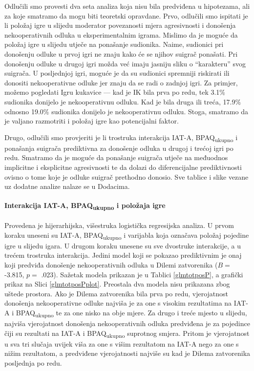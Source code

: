 \documentclass[a4paper, 12pt]{report}
\begin{document}
Odlučili smo provesti dva seta analiza koja nisu bila predviđena u hipotezama,
ali za koje smatramo da mogu biti teoretski opravdane. Prvo, odlučili smo
ispitati je li položaj igre u slijedu moderator povezanosti mjera agresivnosti i
donošenja nekooperativnih odluka u eksperimentalnim igrama. Mislimo da je moguće
da položaj igre u slijedu utječe na ponašanje sudionika. Naime, sudionici 
pri donošenju odluke u prvoj igri ne znaju kako će se njihov suigrač ponašati.
Pri donošenju odluke u drugoj igri možda već imaju jasniju sliku o
\enquote{karakteru} svog suigrača. U posljednjoj igri, moguće je da su sudionici
spremniji riskirati ili donositi nekooperativne odluke jer znaju da se radi o
zadnjoj igri. Za primjer, možemo pogledati Igru kukavice --- kad je IK bila prva
po redu, tek 3.1\% sudionika donijelo je nekooperativnu odluku. Kad je bila
druga ili treća, 17.9\% odnosno 19.0\% sudionika donijelo je nekooperativnu
odluku. Stoga, smatramo da je valjano razmotriti i položaj igre kao
potencijalni faktor. 

Drugo, odlučili smo provjeriti je li trostruka interakcija
IAT-A, BPAQ\textsubscript{ukupno} i ponašanja suigrača prediktivna za donošenje
odluka u drugoj i trećoj igri po redu. Smatramo da je moguće da ponašanje suigrača
utječe na međuodnos implicitne i eksplicitne agresivnosti te da dolazi do
diferencijalne prediktivnosti ovisno o tome koje je odluke suigrač prethodno
donosio. Sve tablice i slike vezane uz dodatne analize nalaze se u
Dodacima. 

\paragraph{Interakcija IAT-A, BPAQ\textsubscript{ukupno} i položaja igre} 
Provedena je hijerarhijska, višestruka logistička regresijska analiza. U prvom
koraku uneseni su IAT-A, BPAQ\textsubscript{ukupno} i varijabla koja označava
položaj pojedine igre u slijedu igara. U drugom koraku unesene su sve dvostruke
interakcije, a u trećem trostruka interakcija.
Jedini model koji se pokazao prediktivnim je onaj koji predviđa donošenje
nekooperativnih odluka u Dilemi zatvorenika 
($B =$ -3.815, $p =$ .023). Sažetak modela prikazan je u Tablici
\ref{glmtotposP}, a grafički prikaz na Slici \ref{glmtotposPplot}. Preostala
dva modela nisu prikazana zbog  uštede prostora.
Ako je Dilema zatvorenika bila prva po redu, vjerojatnost donošenja nekooperativne odluke
najviša je za one s visokim rezultatima na IAT-A i BPAQ\textsubscript{ukupno}
te za one nisko na obje mjere. Za drugo i treće mjesto u slijedu,
najviša vjerojatnost donošenja nekooperativnih odluka predviđena je za pojedince
čiji su rezultati na IAT-A i BPAQ\textsubscript{ukupno} suprotnog
smjera. Pritom je vjerojatnost u sva tri slučaja uvijek viša za one s višim
rezultatom na IAT-A nego za one s nižim rezultatom, a predviđene vjerojatnosti
najviše su kad je Dilema zatvorenika posljednja po redu.
\end{document}

